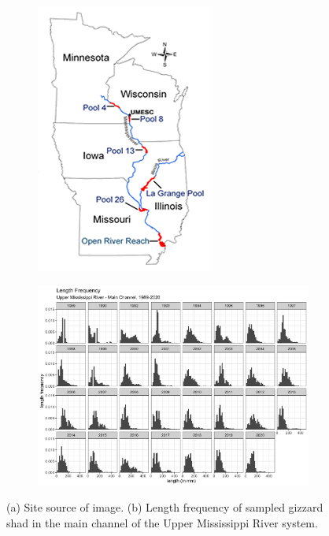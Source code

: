 \documentclass[preprint,review,12pt,authoryear]{elsarticle}
\begin{document}
\begin{figure}
\centering
\begin{subfigure}[b]{.43\textwidth}  
  \includegraphics[width=.6\textwidth]{figures/field_stations.png}
  \caption{}
  \label{fig:field_stations}
\end{subfigure}
\begin{subfigure}[b]{.43\textwidth} 
   \includegraphics[width=1.1\textwidth]{figures/LTRMmain.png}
   \caption{}
   \label{fig:LTRMmain}
\end{subfigure}
\caption{(a) Site source of image.  (b) Length frequency of sampled gizzard shad in the main channel of the Upper Mississippi River system.}
\end{figure}    
\end{document}
